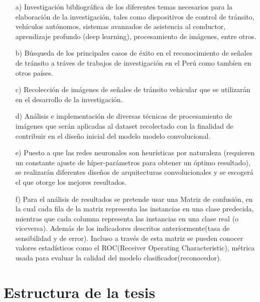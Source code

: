 		\begin{enumerate}

		\item[a)]	Investigación bibliográfica de los diferentes temas necesarios para la elaboración de la investigación, tales como dispositivos de control de tránsito, vehículos autónomos, sistemas avanzados de asistencia al conductor, aprendizaje profundo (deep learning), procesamiento de imágenes, entre otros.
		
		\item[b)]	Búsqueda de los principales casos de éxito en el reconocimiento de señales de tránsito a tráves de trabajos de investigación en el Perú como tambíen en otros países.

		\item[c)]	Recolección de imágenes de señales de tránsito vehicular que se utilizarán en el desarrollo de la investigación.

		\item[d)]	Análisis e implementación de diversas técnicas de procesamiento de imágenes que serán aplicadas al dataset recolectado con la finalidad de contribuir en el diseño inicial del modelo modelo convolucional.

		\item[e)]	Puesto a que las redes neuronales son heurísticas por naturaleza (requieren un constante ajuste de híper-parámetros para obtener un óptimo resultado), se realizarán diferentes diseños de arquitecturas convolucionales y se escogerá el que otorge los mejores resultados.
		
		\item[f)]	Para el análisis de resultados se pretende usar una Matriz de confusión, en la cual cada fila de la matriz representa las instancias en una clase predecida, mientras que cada columna representa las instancias en una clase real (o viceversa). Además de los indicadores descritos anteriormente(tasa de sensibilidad y de error). Incluso a través de esta matriz se pueden conocer valores estadísticos como el ROC(Receiver Operating Characteristic), métrica usada para evaluar la calidad del modelo clasificador(reconocedor).
		
		\end{enumerate}



\section{Estructura de la tesis}

